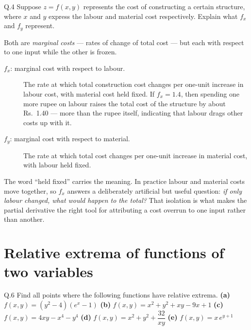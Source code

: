 \begin{question}{Q.4}
Suppose $z=f(x,y)$ represents the cost of constructing a certain structure,
where $x$ and $y$ express the labour and material cost respectively. Explain
what $f_x$ and $f_y$ represent.
\end{question}

\begin{solution}
Both are \emph{marginal costs} --- rates of change of total cost --- but each
with respect to one input while the other is frozen.

\begin{description}
  \item[$f_x$: marginal cost with respect to labour.] The rate at which total
        construction cost changes per one-unit increase in labour cost, with
        material cost held fixed. If $f_x=1.4$, then spending one more rupee on
        labour raises the total cost of the structure by about Rs.~1.40 ---
        more than the rupee itself, indicating that labour drags other costs up
        with it.
  \item[$f_y$: marginal cost with respect to material.] The rate at which total
        cost changes per one-unit increase in material cost, with labour held
        fixed.
\end{description}

The word ``held fixed'' carries the meaning. In practice labour and material
costs move together, so $f_x$ answers a deliberately artificial but useful
question: \emph{if only labour changed, what would happen to the total?} That
isolation is what makes the partial derivative the right tool for attributing a
cost overrun to one input rather than another.

\end{solution}

\section{Relative extrema of functions of two variables}

\begin{question}{Q.6}
Find all points where the following functions have relative extrema.
\textbf{(a)} $f(x,y)=(y^{2}-4)(e^{x}-1)$ \quad
\textbf{(b)} $f(x,y)=x^{2}+y^{2}+xy-9x+1$ \quad
\textbf{(c)} $f(x,y)=4xy-x^{4}-y^{4}$ \quad
\textbf{(d)} $f(x,y)=x^{2}+y^{2}+\dfrac{32}{xy}$ \quad
\textbf{(e)} $f(x,y)=x\,e^{y+1}$
\end{question}

